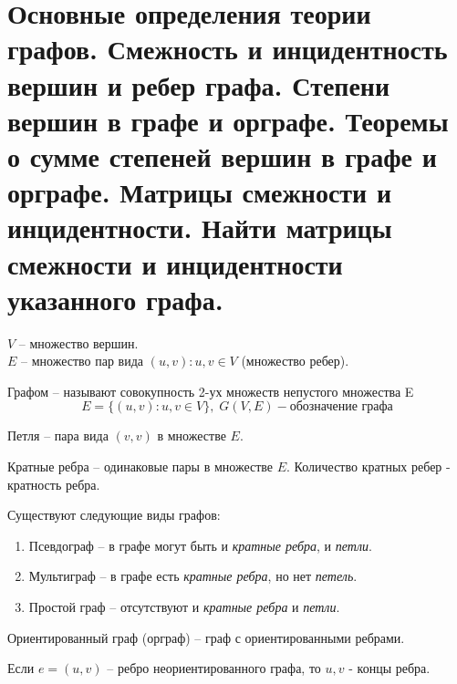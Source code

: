 \section{Основные определения теории графов. Смежность и инцидентность вершин и ребер графа. 
Степени вершин в графе и орграфе. Теоремы о сумме степеней вершин в графе и орграфе. 
Матрицы смежности и инцидентности. Найти матрицы смежности и инцидентности указанного 
графа.}

$V$ -- множество вершин. \\
$E$ -- множество пар вида $(u, v): u, v \in V$ (множество ребер).

\begin{definition}
    Графом -- называют совокупность 2-ух множеств непустого множества E
	\begin{equation*}
		E = \{(u, v): u, v \in V\}, \; G(V, E) - \textit{обозначение графа}
	\end{equation*}
\end{definition}

\begin{definition}
    Петля -- пара вида $(v,v)$ в множестве $E$.
\end{definition}

\begin{definition}
    Кратные ребра -- одинаковые пары в множестве $E$. Количество кратных ребер - кратность ребра.
\end{definition}

\noindent
Существуют следующие виды графов:
\begin{enumerate}[left=0.0em, labelsep=1em, topsep=0.5em, itemsep=0pt, parsep=0.5em]
    \item Псевдограф -- в графе могут быть и \textit{кратные ребра}, и \textit{петли}.
    \item Мультиграф -- в графе есть \textit{кратные ребра}, но нет \textit{петель}.
    \item Простой граф -- отсутствуют и \textit{кратные ребра} и \textit{петли}.
\end{enumerate}

\begin{definition}
    Ориентированный граф (орграф) -- граф с ориентированными ребрами.
\end{definition}

\begin{definition}
    Если $e=(u,v)$ -- ребро неориентированного графа, то $u, v$ - концы ребра.
\end{definition}

